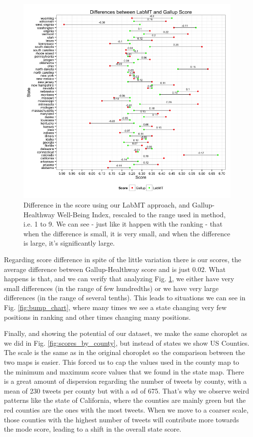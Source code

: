\documentclass{llncs}
\begin{document}
\begin{figure}[!ht]
\centering
\includegraphics[width=\textwidth]{images/differences}
\caption{Difference in the score using our LabMT approach, and Gallup-Healthway Well-Being Index, rescaled to the range used in \cite{Dodds2009,Dodds2011} method, i.e. 1 to 9. We can see - just like it happen with the ranking - that when the difference is small, it is very small, and when the difference is large, it's significantly large.}
\label{fig:differences}
\end{figure}

Regarding score difference in spite of the little variation there is our scores, the average difference between Gallup-Healthway score and is just 0.02. What happens is that, and we can verify that analyzing Fig. \ref{fig:differences}, we either have very small differences (in the range of few hundredths) or we have very large differences (in the range of several tenths). This leads to situations we can see in Fig. \ref{fig:bump_chart}, where many times we see a state changing very few positions in ranking and other times changing many positions.

Finally, and showing the potential of our dataset, we make the same choroplet as we did in Fig. \ref{fig:scores_by_county}, but instead of states we show US Counties. The scale is the same as in the original choroplet so the comparison between the two maps is easier. This forced us to cap the values used in the county map to the minimum and maximum score values that we found in the state map.
There is a great amount of dispersion regarding the number of tweets by county, with a mean of 230 tweets per county but with a sd of 675. That's why we observe weird patterns like the state of California, where the counties are mainly green but the red counties are the ones with the most tweets. When we move to a coarser scale, those counties with the highest number of tweets will contribute more towards the mode score, leading to a shift in the overall state score.
\end{document}
